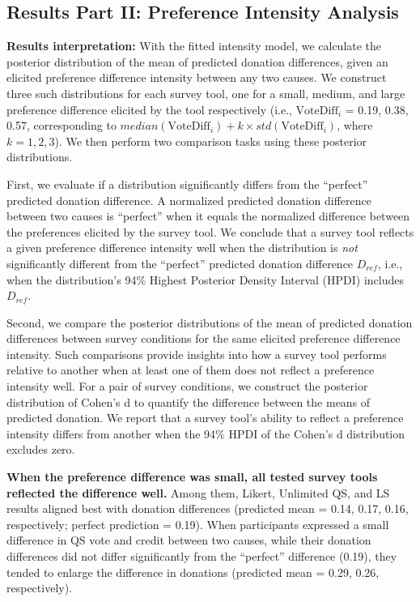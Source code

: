 \subsection{Results Part II: Preference Intensity Analysis}

\textbf{Results interpretation:} With the fitted intensity model, we calculate the posterior distribution of the mean of predicted donation differences, given an elicited preference difference intensity between any two causes. We construct three such distributions for each survey tool, one for a small, medium, and large preference difference elicited by the tool respectively (i.e., $\text{VoteDiff}_i$ = 0.19, 0.38, 0.57, corresponding to $median(\text{VoteDiff}_i)+k \times std(\text{VoteDiff}_i)$, where $k=1, 2, 3$). We then perform two comparison tasks using these posterior distributions. 

First, we evaluate if a distribution significantly differs from the ``perfect'' predicted donation difference. A normalized predicted donation difference between two causes is ``perfect'' when it equals the normalized difference between the preferences elicited by the survey tool. We conclude that a survey tool reflects a given preference difference intensity well when the distribution is \textit{not} significantly different from the ``perfect'' predicted donation difference $D_{ref}$, i.e., when the distribution's 94\% Highest Posterior Density Interval (HPDI) includes $D_{ref}$.

Second, we compare the posterior distributions of the mean of predicted donation differences between survey conditions for the same elicited preference difference intensity. Such comparisons provide insights into how a survey tool performs relative to another when at least one of them does not reflect a preference intensity well. For a pair of survey conditions, we construct the posterior distribution of Cohen's d to quantify the difference between the means of predicted donation. We report that a survey tool's ability to reflect a preference intensity differs from another when the 94\% HPDI of the Cohen's d distribution excludes zero. 

\textbf{When the preference difference was small, all tested survey tools reflected the difference well.} Among them, Likert, Unlimited QS, and LS results aligned best with donation differences (predicted mean = 0.14, 0.17, 0.16, respectively; perfect prediction = 0.19). When participants expressed a small difference in QS vote and credit between two causes, while their donation differences did not differ significantly from the ``perfect'' difference (0.19), they tended to enlarge the difference in donations (predicted mean = 0.29, 0.26, respectively). 

